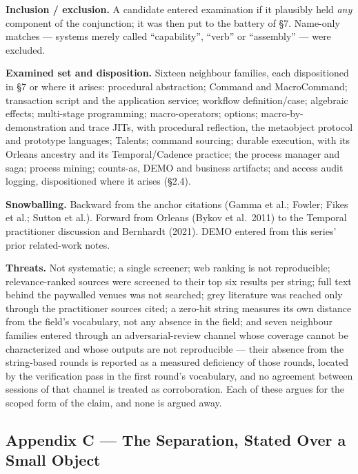\documentclass[
]{article}
\newcounter{none} %
\begin{document}
\textbf{Inclusion / exclusion.} A candidate entered examination if it
plausibly held \emph{any} component of the conjunction; it was then put
to the battery of §7. Name-only matches --- systems merely called
``capability'', ``verb'' or ``assembly'' --- were excluded.

\textbf{Examined set and disposition.} Sixteen neighbour families, each
dispositioned in §7 or where it arises: procedural abstraction; Command
and MacroCommand; transaction script and the application service;
workflow definition/case; algebraic effects; multi-stage programming;
macro-operators; options; macro-by-demonstration and trace JITs, with
procedural reflection, the metaobject protocol and prototype languages;
Talents; command sourcing; durable execution, with its Orleans ancestry
and its Temporal/Cadence practice; the process manager and saga; process
mining; counts-as, DEMO and business artifacts; and access audit
logging, dispositioned where it arises (§2.4).

\textbf{Snowballing.} Backward from the anchor citations (Gamma et al.;
Fowler; Fikes et al.; Sutton et al.). Forward from Orleans (Bykov et
al.~2011) to the Temporal practitioner discussion and Bernhardt (2021).
DEMO entered from this series' prior related-work notes.

\textbf{Threats.} Not systematic; a single screener; web ranking is not
reproducible; relevance-ranked sources were screened to their top six
results per string; full text behind the paywalled venues was not
searched; grey literature was reached only through the practitioner
sources cited; a zero-hit string measures its own distance from the
field's vocabulary, not any absence in the field; and seven neighbour
families entered through an adversarial-review channel whose coverage
cannot be characterized and whose outputs are not reproducible --- their
absence from the string-based rounds is reported as a measured
deficiency of those rounds, located by the verification pass in the
first round's vocabulary, and no agreement between sessions of that
channel is treated as corroboration. Each of these argues for the scoped
form of the claim, and none is argued away.

\subsection{Appendix C --- The Separation, Stated Over a Small
Object}\label{appendix-c-the-separation-stated-over-a-small-object}
\end{document}

